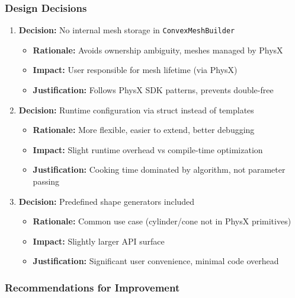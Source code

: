 \subsubsection{Design Decisions}

\begin{enumerate}
    \item \textbf{Decision:} No internal mesh storage in \texttt{ConvexMeshBuilder}
    \begin{itemize}
        \item \textbf{Rationale:} Avoids ownership ambiguity, meshes managed by PhysX
        \item \textbf{Impact:} User responsible for mesh lifetime (via PhysX)
        \item \textbf{Justification:} Follows PhysX SDK patterns, prevents double-free
    \end{itemize}

    \item \textbf{Decision:} Runtime configuration via struct instead of templates
    \begin{itemize}
        \item \textbf{Rationale:} More flexible, easier to extend, better debugging
        \item \textbf{Impact:} Slight runtime overhead vs compile-time optimization
        \item \textbf{Justification:} Cooking time dominated by algorithm, not parameter passing
    \end{itemize}

    \item \textbf{Decision:} Predefined shape generators included
    \begin{itemize}
        \item \textbf{Rationale:} Common use case (cylinder/cone not in PhysX primitives)
        \item \textbf{Impact:} Slightly larger API surface
        \item \textbf{Justification:} Significant user convenience, minimal code overhead
    \end{itemize}
\end{enumerate}

\subsubsection{Recommendations for Improvement}

